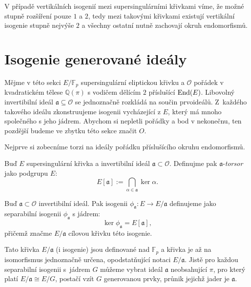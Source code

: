 \documentclass[12pt]{report}
\begin{document}
V případě vertikálních isogenií mezi supersingulárními křivkami víme, že možné stupně rozšíření pouze $1$ a $2$, tedy mezi takovými křivkami existují vertikální isogenie stupně nejvýše $2$ a všechny ostatní nutně zachovají okruh endomorfismů.

\section{Isogenie generované ideály}

Mějme v této sekci $E/\mathbb{F}_p$ supersingulární eliptickou křivku a $\mathcal{O}$ pořádek v kvadratickém tělese $\mathbb{Q}(\pi)$ s vodičem dělícím $2$ příslušící $\operatorname{End}(E)$. Libovolný invertibilní ideál $\mathfrak{a} \subseteq \mathcal{O}$ se jednoznačně rozkládá na součin prvoideálů. Z~každého takového ideálu zkonstruujeme isogenii vycházející z $E$, který má mnoho společného s jeho jádrem. Abychom si nepletli pořádky a bod v nekonečnu, ten pozdější budeme ve zbytku této sekce značit $O$.

Nejprve si zobecníme torzi na ideály pořádku příslušícího okruhu endomorfismů.

\begin{definice}
Buď $E$ supersingulární křivka a invertibilní ideál $\mathfrak{a} \subset \mathcal{O}$.  Definujme pak $\mathfrak{a}$-\textit{torsor} jako podgrupu $E$:
\begin{equation*}
E[\mathfrak{a}] := \bigcap_{\alpha \in \mathfrak{a}} \ker \alpha.
\end{equation*}
\end{definice}

\begin{definice}
Buď $\mathfrak{a} \subset \mathcal{O}$ invertibilní ideál. Pak isogenii $\phi_{\mathfrak{a}} : E \longrightarrow E/\mathfrak{a}$ definujeme jako separabilní isogenii $\phi_{\mathfrak{a}}$ s jádrem:
\begin{equation*}
\ker \phi_{\mathfrak{a}} = E[\mathfrak{a}],
\end{equation*}
přičemž značme $E/\mathfrak{a}$ cílovou křivku této isogenie.
\end{definice}

Tato křivka $E/\mathfrak{a}$ (i isogenie) jsou definované nad $\mathbb{F}_p$ a křivka je až na isomorfismus jednoznačně určena, opodstatňující notaci $E/\mathfrak{a}$. Jistě pro každou separabilní isogenii s~jádrem $G$ můžeme vybrat ideál $\mathfrak{a}$ neobsahující $\pi$, pro který platí $E/\mathfrak{a} \cong E/G$, postačí vzít $G$ generovanou prvky, průnik jejichž jader je $\mathfrak{a}$. 
\end{document}
